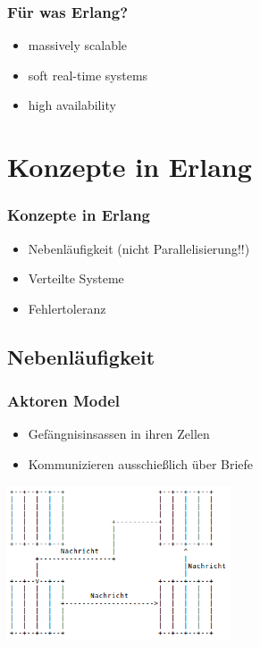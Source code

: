\documentclass{beamer}
\begin{document}
\begin{frame} %
  \frametitle{Für was Erlang?} %
  \begin{itemize} %
    \item massively scalable
    \item soft real-time systems
    \item high availability
  \end{itemize}
\end{frame}

\section{Konzepte in Erlang}
\begin{frame} %
  \frametitle{Konzepte in Erlang} %
  \begin{itemize} %
    \item Nebenläufigkeit (nicht Parallelisierung!!)
    \item Verteilte Systeme
    \item Fehlertoleranz
  \end{itemize}
\end{frame}

\subsection{Nebenläufigkeit}
\begin{frame} %
  \frametitle{Aktoren Model} %
  \begin{itemize} %
    \item Gefängnisinsassen in ihren Zellen
    \item Kommunizieren ausschießlich über Briefe
  \end{itemize}
  \includegraphics[width=250px]{img/actoren}
\end{frame}
\end{document}
